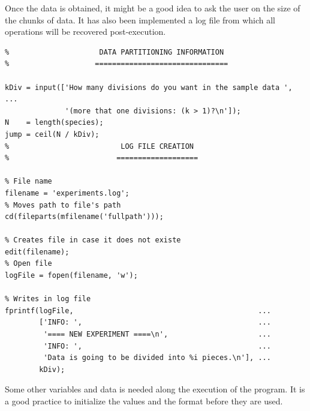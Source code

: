 \documentclass[11pt]{article}
\begin{document}
Once the data is obtained, it might be a good idea to ask the user on the size
of the chunks of data. It has also been implemented a log file from which all
operations will be recovered post-execution.

\begin{verbatim}
%                     DATA PARTITIONING INFORMATION
%                    ===============================

kDiv = input(['How many divisions do you want in the sample data ', ...
              '(more that one divisions: (k > 1)?\n']);
N    = length(species);
jump = ceil(N / kDiv);
%                          LOG FILE CREATION
%                         ===================

% File name
filename = 'experiments.log';
% Moves path to file's path
cd(fileparts(mfilename('fullpath')));

% Creates file in case it does not existe
edit(filename);
% Open file 
logFile = fopen(filename, 'w');

% Writes in log file
fprintf(logFile,                                           ...
        ['INFO: ',                                         ...
         '==== NEW EXPERIMENT ====\n',                     ...
         'INFO: ',                                         ...
         'Data is going to be divided into %i pieces.\n'], ...
        kDiv);
\end{verbatim}

Some other variables and data is needed along the execution of the program. It
is a good practice to initialize the values and the format before they are used.
\end{document}
